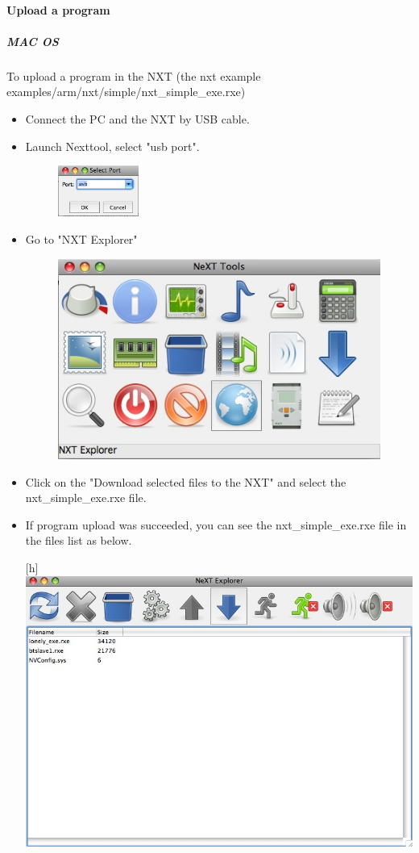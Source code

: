 \paragraph{Upload a program}
\subparagraph{MAC OS}
To upload a program in the NXT (the nxt example examples/arm/nxt/simple/nxt\_simple\_exe.rxe)
\begin{itemize}
\item Connect the PC and the NXT by USB cable.
\item Launch Nexttool, select "usb port".
	\begin{figure}[htbp] %
   		\centering
		\includegraphics[width=0.25\textwidth]{pictures/usbport.jpg}
	\end{figure}
\item Go to "NXT Explorer"
	\begin{figure}[htbp] %
   		\centering
		\includegraphics[width=.7\textwidth]{pictures/nxtexplorer.jpg}
	\end{figure}
\item Click on the "Download selected files to the NXT" and select the nxt\_simple\_exe.rxe file.
\item If program upload was succeeded, you can see the nxt\_simple\_exe.rxe file in the files list as below.
	\begin{center}[h] %
		\includegraphics[width=1\textwidth]{pictures/downloadfile.jpg}

\end{center}
\end{itemize}
